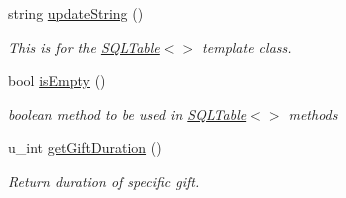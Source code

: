 \begin{CompactItemize}
string \hyperlink{classgiftDetails_giftDetailsa13}{update\-String} ()
\begin{CompactList}\small\item\em This is for the \hyperlink{classSQLTable}{SQLTable}$<$$>$ template class.\item\end{CompactList}\item 
bool \hyperlink{classgiftDetails_giftDetailsa14}{is\-Empty} ()
\begin{CompactList}\small\item\em boolean method to be used in \hyperlink{classSQLTable}{SQLTable}$<$$>$ methods\item\end{CompactList}\item 
u\_\-int \hyperlink{classgiftDetails_giftDetailsa15}{get\-Gift\-Duration} ()
\begin{CompactList}\small\item\em Return duration of specific gift.\item\end{CompactList}\end{CompactItemize}
